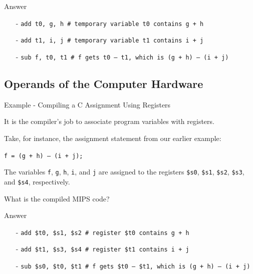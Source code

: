 \begin{frame}[fragile]{Answer}
\begin{itemize}
\item[-]
\texttt{add t0, g, h \# temporary variable t0 contains g + h}

\item[-]
\texttt{add t1, i, j \# temporary variable t1 contains i + j}

\item[-]
\texttt{sub f, t0, t1 \# f gets t0 – t1, which is (g + h) – (i + j)}
\end{itemize}
\end{frame}

\subsection{Operands of the Computer Hardware}
\begin{frame}{Example - Compiling a C Assignment Using Registers}
\begin{flushleft}
It is the compiler’s job to associate program variables with registers. 

Take, for instance, the assignment statement from our earlier example:

\hspace{8mm}\texttt{f = (g + h) – (i + j);}

The variables \texttt{f}, \texttt{g}, \texttt{h}, \texttt{i}, and \texttt{j} are assigned to the registers \texttt{\$s0}, \texttt{\$s1}, \texttt{\$s2}, \texttt{\$s3},
and \texttt{\$s4}, respectively. 

What is the compiled MIPS code?
\end{flushleft}
\end{frame}

\begin{frame}[fragile]{Answer}
\begin{itemize}
\item[-]
\texttt{add \$t0, \$s1, \$s2  \# register \$t0 contains g + h}

\item[-]
\texttt{add \$t1, \$s3, \$s4  \# register \$t1 contains i + j}

\item[-]
\texttt{sub \$s0, \$t0, \$t1  \# f gets \$t0 – \$t1, which is (g + h) – (i + j)}
\end{itemize}
\end{frame}

